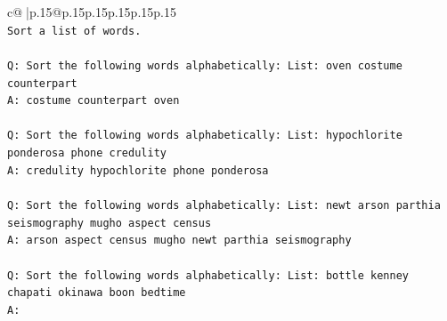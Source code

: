 \documentclass{article}
\begin{document}
{\begin{supertabular}{c@{$\;$}|p{.15\linewidth}@{}p{.15\linewidth}p{.15\linewidth}p{.15\linewidth}p{.15\linewidth}p{.15\linewidth}}
{{{\\ 
\texttt{Sort a list of words.} \\
\\ 
\texttt{Q: Sort the following words alphabetically: List: oven costume counterpart} \\
\texttt{A: costume counterpart oven} \\
\\ 
\texttt{Q: Sort the following words alphabetically: List: hypochlorite ponderosa phone credulity} \\
\texttt{A: credulity hypochlorite phone ponderosa} \\
\\ 
\texttt{Q: Sort the following words alphabetically: List: newt arson parthia seismography mugho aspect census} \\
\texttt{A: arson aspect census mugho newt parthia seismography} \\
\\ 
\texttt{Q: Sort the following words alphabetically: List: bottle kenney chapati okinawa boon bedtime} \\
\texttt{A:} \\
            }
        }
    }
     \\ \\


\end{supertabular}}
\end{document}
